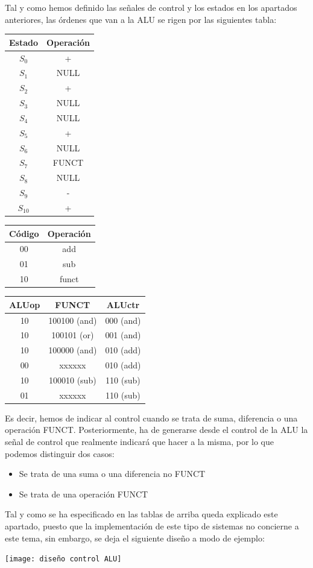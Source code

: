 \documentclass[a4paper,10pt]{book}
\begin{document}
Tal y como hemos definido las señales de control y los estados en los apartados anteriores, las órdenes que van a la ALU se rigen por las siguientes tabla:
\begin{center}
\begin{multicols}{2}
\begin{tabular}{|c|c|}
\hline
Estado & Operación \\
\hline
$S_0$ & + \\
\hline
$S_1$ & NULL \\
\hline
$S_2$ & + \\
\hline
$S_3$ & NULL \\
\hline
$S_4$ & NULL \\
\hline
$S_5$ & + \\
\hline
$S_6$ & NULL \\
\hline
$S_7$ & FUNCT \\
\hline
$S_8$ & NULL \\
\hline
$S_9$ & - \\
\hline
$S_{10}$ & + \\
\hline
\end{tabular}

\begin{tabular}{|c|c|}
\hline
Código & Operación \\
\hline
00 & add \\
\hline
01 & sub \\
\hline
10 & funct \\
\hline
\end{tabular}

\begin{tabular}{|c|c|c|}
\hline
ALUop & FUNCT & ALUctr \\
\hline
10 & 100100 (and) & 000 (and) \\
\hline
10 & 100101 (or) & 001 (and) \\
\hline
10 & 100000 (and) & 010 (add) \\
\hline
00 & xxxxxx & 010 (add) \\
\hline
10 & 100010 (sub) & 110 (sub) \\
\hline
01 & xxxxxx & 110 (sub) \\
\hline
\end{tabular}
\end{multicols}
\end{center}
Es decir, hemos de indicar al control cuando se trata de suma, diferencia o una operación FUNCT. Posteriormente, ha de generarse desde el control de la ALU la señal de control que realmente indicará que hacer a la misma, por lo que podemos distinguir dos casos:
\begin{itemize}
\item Se trata de una suma o una diferencia no FUNCT
\item Se trata de una operación FUNCT
\end{itemize}
Tal y como se ha especificado en las tablas de arriba queda explicado este apartado, puesto que la implementación de este tipo de sistemas no concierne a este tema, sin embargo, se deja el siguiente diseño a modo de ejemplo:
\begin{center}
\texttt{[image: diseño control ALU]}
\end{center}
\end{document}
